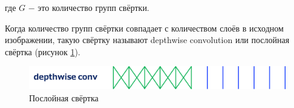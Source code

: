 \noindent где $G$ $-$ это количество групп свёртки.

Когда количество групп свёртки совпадает с количеством слоёв в исходном изображении, такую свёртку называют depthwise convolution или послойная свёртка (рисунок \ref{fig:depthwise_conv}).

\begin{figure}[ht]
    \centering
    \includegraphics[width=\textwidth*2/3]{images/depthwise_conv.png}
    \caption{Послойная свёртка}
    \label{fig:depthwise_conv}
\end{figure}
